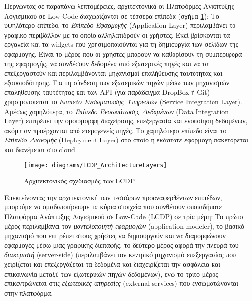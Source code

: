             Περνώντας σε παραπάνω λεπτομέρειες, αρχιτεκτονικά οι Πλατφόρμες Ανάπτυξης Λογισμικού σε Low-Code διαχωρίζονται σε τέσσερα επίπεδα (σχήμα \ref{fig:LCDP_ArchitectureLayers}): Το υψηλότερο επίπεδο, το \textit{Επίπεδο Εφαρμογής} (Application Layer) περιλαμβάνει το γραφικό περιβάλλον με το οποίο αλληλεπιδρούν οι χρήστες. Εκεί βρίσκονται τα εργαλεία και τα widgets που χρησιμοποιούνται για τη δημιουργία των σελίδων της εφαρμογής. Είναι το μέρος που οι χρήστες μπορούν να καθορίσουν τη συμπεριφορά της εφαρμογής, να συνδέσουν δεδομένα από εξωτερικές πηγές και να τα επεξεργαστούν και περιλαμβάνονται μηχανισμοί επαλήθευσης ταυτότητας και εξουσιοδότησης. Για τη σύνδεση των εξωτερικών πηγών μέσω των μηχανισμών επαλήθευσης ταυτότητας και των API (για παράδειγμα DropBox ή Git) χρησιμοποιείται το \textit{Επίπεδο Ενσωμάτωσης Υπηρεσιών} (Service Integration Layer). Αμέσως χαμηλότερα, το \textit{Επίπεδο Ενσωμάτωσης Δεδομένων} (Data Integration Layer) επιτρέπει την ομοιόμορφη διαχείρισης, επεξεργασία και ενοποίηση δεδομένων, ακόμα αν προέρχονται από ετερογενείς πηγές. Το χαμηλότερο επίπεδο είναι το \textit{Επίπεδο Διανομής} (Deployment Layer) στο οποίο η εκάστοτε εφαρμογή πακετάρεται και διανέμεται στο cloud \cite{Sahay2020}.

            \begin{figure}[h!] \noindent \centering
                \texttt{[image: diagrams/LCDP\_ArchitectureLayers]}
                \caption{Αρχιτεκτονικός σχεδιασμός των LCDP \cite{Sahay2020}}
                \label{fig:LCDP_ArchitectureLayers}
            \end{figure}

            Επεκτείνοντας την αρχιτεκτονική των τεσσάρων προαναφερθέντων επιπέδων, μπορούμε να ομαδοποιήσουμε τα κύρια στοιχεία που συνθέτουν οποιαδήποτε Πλατφόρμα Ανάπτυξης Λογισμικού σε Low-Code (LCDP) σε τρία μέρη: Το πρώτο μέρος περιλαμβάνει τον \textit{μοντελοποιητή εφαρμογών} (application modeler), το βασικό μηχανισμό που επιτρέπει στους χρήστες να δημιουργούν και να διαμορφώνουν εφαρμογές μέσω μιας γραφικής διεπαφής, το δεύτερο μέρος αφορά την πλευρά του \textit{διακομιστή} (server-side) (περιλαμβάνει τον κεντρικό μηχανισμό επεξεργασίας που χειρίζεται και επεξεργάζεται τα δεδομένα και διαχειρίζεται την ασφάλεια και επικοινωνία μεταξύ των εξωτερικών πηγών δεδομένων), ενώ το τρίτο μέρος επικεντρώνεται στις \textit{εξωτερικές υπηρεσίες} (external services) που ενσωματώνονται στην πλατφόρμα.


